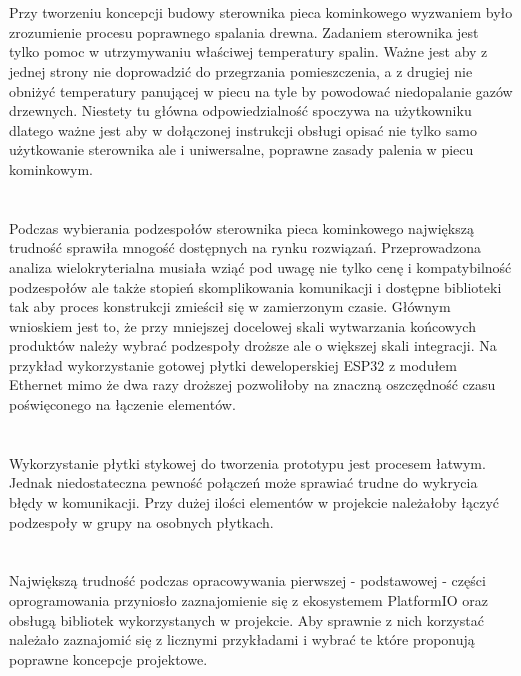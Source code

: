 \documentclass[11pt]{report}
\begin{document}
\section{}
Przy tworzeniu koncepcji budowy sterownika pieca kominkowego wyzwaniem było zrozumienie procesu poprawnego spalania drewna. Zadaniem sterownika jest tylko pomoc w utrzymywaniu właściwej temperatury spalin. Ważne jest aby z jednej strony nie doprowadzić do przegrzania pomieszczenia, a z drugiej nie obniżyć temperatury panującej w piecu na tyle by powodować niedopalanie gazów drzewnych. Niestety tu główna odpowiedzialność spoczywa na użytkowniku dlatego ważne jest aby w dołączonej instrukcji obsługi opisać nie tylko samo użytkowanie sterownika ale i uniwersalne, poprawne zasady palenia w piecu kominkowym.
\section{}
Podczas wybierania podzespołów sterownika pieca kominkowego największą trudność sprawiła mnogość dostępnych na rynku rozwiązań. Przeprowadzona analiza wielokryterialna musiała wziąć pod uwagę nie tylko cenę i kompatybilność podzespołów ale także stopień skomplikowania komunikacji i dostępne biblioteki tak aby proces konstrukcji zmieścił się w zamierzonym czasie.
Głównym wnioskiem jest to, że przy mniejszej docelowej skali wytwarzania końcowych produktów należy wybrać podzespoły droższe ale o większej skali integracji. Na przykład wykorzystanie gotowej płytki deweloperskiej ESP32 z modułem Ethernet mimo że dwa razy droższej pozwoliłoby na znaczną oszczędność czasu poświęconego na łączenie elementów.
\section{}
Wykorzystanie płytki stykowej do tworzenia prototypu jest procesem łatwym. Jednak niedostateczna pewność połączeń może sprawiać trudne do wykrycia błędy w komunikacji.
Przy dużej ilości elementów w projekcie należałoby łączyć podzespoły w grupy na osobnych płytkach.
\section{}
Największą trudność podczas opracowywania pierwszej - podstawowej - części oprogramowania przyniosło zaznajomienie się z ekosystemem PlatformIO oraz obsługą bibliotek wykorzystanych w projekcie. Aby sprawnie z nich korzystać należało zaznajomić się z licznymi przykładami i wybrać te które proponują poprawne koncepcje projektowe.
\end{document}
